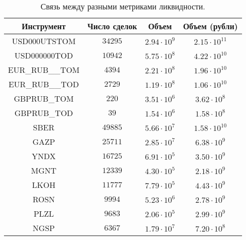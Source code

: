 \begin{table}[h!]
    \begin{center}
        \begin{tabular}{|c|c|c|c|}
            \hline
            Инструмент        & Число сделок & Объем & Объем (рубли) \\ \hline 
            USD000UTSTOM    & $ 34295             $ & $ 2.94 \cdot 10^9 $ & $ 2.15 \cdot 10^{11} $  \\ \hline 
            USD000000TOD    & $ 10942             $ & $ 5.75 \cdot 10^8 $ & $ 4.22 \cdot 10^{10} $  \\ \hline
            EUR\_RUB\_\_TOM & $ 4394              $ & $ 2.21 \cdot 10^8 $ & $ 1.96 \cdot 10^{10} $  \\ \hline
            EUR\_RUB\_\_TOD & $ 2729              $ & $ 1.19 \cdot 10^8 $ & $ 1.06 \cdot 10^{10} $  \\ \hline
            GBPRUB\_TOM     & $ 220               $ & $ 3.51 \cdot 10^6 $ & $ 3.62 \cdot 10^{8 } $  \\ \hline
            GBPRUB\_TOD     & $ 39                $ & $ 1.54 \cdot 10^6 $ & $ 1.58 \cdot 10^{8 } $  \\ \hline
            SBER            & $49885              $ & $ 5.66 \cdot 10^7 $ & $ 1.58 \cdot 10^{10} $  \\ \hline
            GAZP            & $25711              $ & $ 2.85 \cdot 10^7 $ & $ 6.38 \cdot 10^{ 9} $  \\ \hline
            YNDX            & $16725              $ & $ 6.91 \cdot 10^5 $ & $ 3.50 \cdot 10^{ 9} $  \\ \hline
            MGNT            & $12339              $ & $ 4.30 \cdot 10^5 $ & $ 2.18 \cdot 10^{ 9} $  \\ \hline
            LKOH            & $11777$               & $ 7.79 \cdot 10^5 $ & $ 4.43 \cdot 10^{ 9} $  \\ \hline
            ROSN            & $9994$                & $ 5.23 \cdot 10^6 $ & $ 2.78 \cdot 10^{ 9} $  \\ \hline
            PLZL            & $9683$                & $ 2.06 \cdot 10^5 $ & $ 2.99 \cdot 10^{ 9} $  \\ \hline
            NGSP            & $6367$                & $ 1.79 \cdot 10^7 $ & $ 7.20 \cdot 10^{ 8} $  \\ \hline
        \end{tabular}
    \end{center}
    \caption{Связь между разными метриками ликвидности.}
    \label{liqmetrics}
\end{table} 
